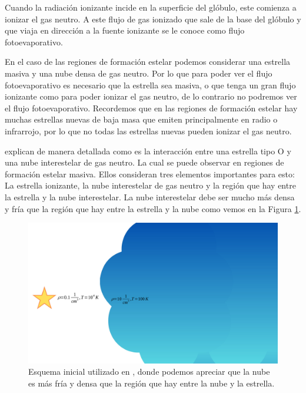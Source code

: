 \documentclass{book}
\begin{document}
Cuando la radiación ionizante incide en la superficie del glóbulo,
este comienza a ionizar el gas neutro. A este flujo de gas ionizado
que sale de la base del glóbulo y que viaja en dirección a la fuente
ionizante se le conoce como flujo fotoevaporativo.

En el caso de las regiones de formación estelar podemos considerar una
estrella masiva y una nube densa de gas neutro. Por lo que para poder
ver el flujo fotoevaporativo es necesario que la estrella sea masiva,
o que tenga un gran flujo ionizante como para poder ionizar el gas
neutro, de lo contrario no podremos ver el flujo fotoevaporativo.
Recordemos que en las regiones de formación estelar hay muchas
estrellas nuevas de baja masa que emiten principalmente en radio o
infrarrojo, por lo que no todas las estrellas nuevas pueden ionizar el
gas neutro.

\cite{OortySpitzer_1955} explican de manera detallada como es la
interacción entre una estrella tipo O y una nube interestelar de gas
neutro. La cual se puede observar en regiones de formación estelar
masiva. Ellos consideran tres elementos importantes para esto: La
estrella ionizante, la nube interestelar de gas neutro y la región que
hay entre la estrella y la nube interestelar. La nube interestelar
debe ser mucho más densa y fría que la región que hay entre la
estrella y la nube como vemos en la Figura \ref{kahn_zones}.

\begin{figure}[htb]
    \centering
    \includegraphics[width= \textwidth]{artesanales/ImgFi01-5.pdf}
    \caption{Esquema inicial utilizado en \cite{OortySpitzer_1955},
      donde podemos apreciar que la nube es más fría y densa que la
      región que hay entre la nube y la estrella.}
    \label{kahn_zones}
\end{figure}
\end{document}
